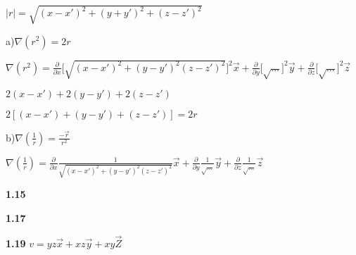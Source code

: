 \documentclass{article}
\begin{document}
$|r|=\sqrt{(x-x')^2 +(y+ y')^2 + (z- z')^2}$\newline

a)$\nabla(r^2) = 2r$

$\nabla(r^2)=\frac{\partial}{\partial x}\bigg[\sqrt{(x-x')^2+(y-y')^2 (z-z')^2}\bigg]^2 \vec x + \frac{\partial}{\partial y}\bigg[\sqrt{...}\bigg]^2\vec y + \frac{\partial}{\partial z}\bigg[\sqrt{...}\bigg]^2 \vec z$

$2(x-x')+2(y-y')+2(z-z')$

$2[(x-x')+(y-y')+(z-z')]=2r$\newline\newline

b)$\nabla (\frac{1}{r})=\frac{-\vec r}{r^2}$

$\nabla(\frac{1}{r})=\frac{\partial}{\partial x}\frac{1}{\sqrt{(x-x')^2+(y-y')^2 (z-z')^2}}\vec x + \frac{\partial}{\partial y}\frac{1}{\sqrt{...}}\vec y + \frac{\partial}{\partial z}\frac{1}{\sqrt{...}}\vec z$





\textbf{1.15}\newline


\textbf{1.17}\newline


\textbf{1.19}\newline
$v = yz \vec x + xz \vec y + xy \vec Z$
\end{document}
